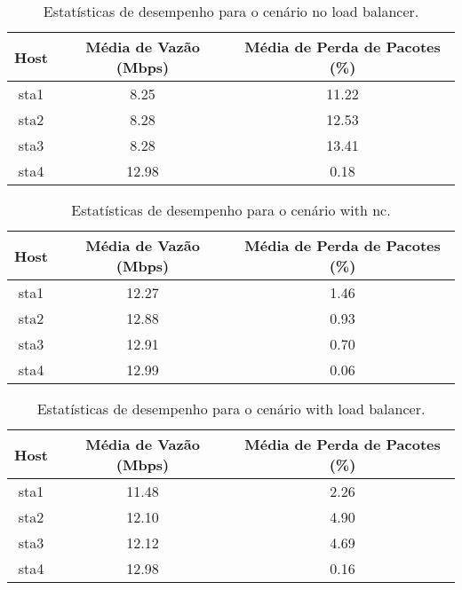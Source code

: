 \begin{table}[htbp]
    \centering
    \label{tab:no_load_balancer_stats}
    \begin{tabular}{|c|c|c|}
        \hline
        \textbf{Host} & \textbf{Média de Vazão (Mbps)} & \textbf{Média de Perda de Pacotes (\%)} \\ \hline
        sta1 & 8.25 & 11.22 \\ \hline
        sta2 & 8.28 & 12.53 \\ \hline
        sta3 & 8.28 & 13.41 \\ \hline
        sta4 & 12.98 & 0.18 \\ \hline
    \end{tabular}
    \caption{Estatísticas de desempenho para o cenário no load balancer.}
\end{table}

\begin{table}[htbp]
    \centering
    \label{tab:with_nc_stats}
    \begin{tabular}{|c|c|c|}
        \hline
        \textbf{Host} & \textbf{Média de Vazão (Mbps)} & \textbf{Média de Perda de Pacotes (\%)} \\ \hline
        sta1 & 12.27 & 1.46 \\ \hline
        sta2 & 12.88 & 0.93 \\ \hline
        sta3 & 12.91 & 0.70 \\ \hline
        sta4 & 12.99 & 0.06 \\ \hline
    \end{tabular}
    \caption{Estatísticas de desempenho para o cenário with nc.}
\end{table}

\begin{table}[htbp]
    \centering
    \label{tab:with_load_balancer_stats}
    \begin{tabular}{|c|c|c|}
        \hline
        \textbf{Host} & \textbf{Média de Vazão (Mbps)} & \textbf{Média de Perda de Pacotes (\%)} \\ \hline
        sta1 & 11.48 & 2.26 \\ \hline
        sta2 & 12.10 & 4.90 \\ \hline
        sta3 & 12.12 & 4.69 \\ \hline
        sta4 & 12.98 & 0.16 \\ \hline
    \end{tabular}
    \caption{Estatísticas de desempenho para o cenário with load balancer.}
\end{table}

